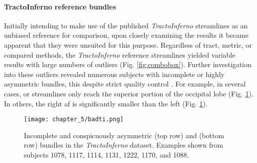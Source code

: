 \paragraph*{TractoInferno reference bundles}


Initially intending to make use of the published \textit{TractoInferno} streamlines as an unbiased reference for comparison, upon closely examining the results it became apparent that they were unsuited for this purpose.
Regardless of tract, metric, or compared methods, the \textit{TractoInferno} reference streamlines yielded variable results with large numbers of outliers (Fig. \ref{fig:combobox}).
Further investigation into these outliers revealed numerous subjects with incomplete or highly asymmetric bundles, this despite strict quality control \autocite{Poulin2022a}.
For example, in several cases, \gls{or} streamlines only reach the superior portion of the occipital lobe (Fig. \ref{fig:duds}).
In others, the right \gls{af} is significantly smaller than the left (Fig. \ref{fig:duds}).

\begin{figure}[h!]
  \centering
  \texttt{[image: chapter\_5/badti.png]}
  \caption[Incomplete bundles in the \textit{TractoInferno} reference data]{Incomplete and conspicuously asymmetric  (top row) and  (bottom row) bundles in the \textit{TractoInferno} dataset. Examples shown from subjects 1078, 1117, 1114, 1131, 1222, 1170, and 1088.}
  \label{fig:duds}
\end{figure}

